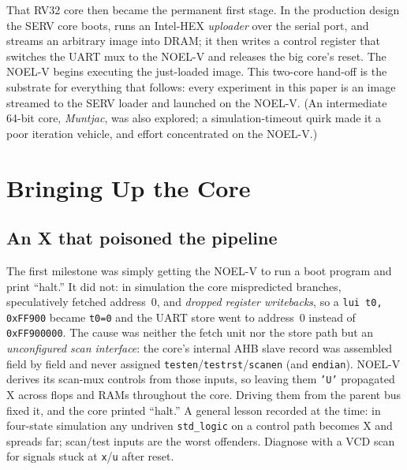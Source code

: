\documentclass[conference,nofonttune]{IEEEtran}
\newcommand{\code}[1]{\texttt{#1}}
\newcommand{\reg}[1]{\texttt{#1}}
\begin{document}
That RV32 core then became the permanent first stage. In the production design
the SERV core boots, runs an Intel-HEX \emph{uploader} over the serial port, and
streams an arbitrary image into DRAM; it then writes a control register that
switches the UART mux to the NOEL-V and releases the big core's reset. The
NOEL-V begins executing the just-loaded image. This two-core hand-off is the
substrate for everything that follows: every experiment in this paper is an
image streamed to the SERV loader and launched on the NOEL-V. (An intermediate
64-bit core, \emph{Muntjac}, was also explored; a simulation-timeout quirk made
it a poor iteration vehicle, and effort concentrated on the NOEL-V.)

\section{Bringing Up the Core}
\label{sec:core}

\subsection{An X that poisoned the pipeline}
The first milestone was simply getting the NOEL-V to run a boot program and print
``halt.'' It did not: in simulation the core mispredicted branches, speculatively
fetched address~0, and \emph{dropped register writebacks}, so a
\code{lui t0, 0xFF900} became \code{t0=0} and the UART store went to
address~0 instead of \code{0xFF900000}. The cause was neither the fetch unit nor
the store path but an \emph{unconfigured scan interface}: the core's internal AHB
slave record was assembled field by field and never assigned
\reg{testen}/\reg{testrst}/\reg{scanen} (and \reg{endian}). NOEL-V derives its
scan-mux controls from those inputs, so leaving them \code{'U'} propagated X
across flops and RAMs throughout the core. Driving them from the parent bus fixed
it, and the core printed ``halt.'' A general lesson recorded at the time: in
four-state simulation any undriven \code{std\_logic} on a control path becomes X
and spreads far; scan/test inputs are the worst offenders. Diagnose with a VCD
scan for signals stuck at \code{x}/\code{u} after reset.
\end{document}
